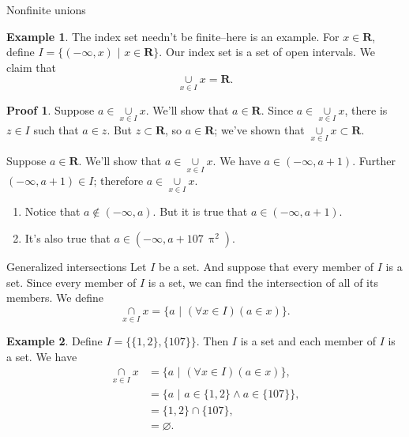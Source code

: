 \documentclass[fleqn]{beamer}
\newcommand{\reals}{\mathbf{R}}
\theoremstyle{definition}
\newtheorem{myex}{Example}
\newtheorem{myproof}{Proof}
\begin{document}
\begin{frame}{Nonfinite unions}

\begin{myex}  The index set needn't be finite--here is an example.  For \(x \in \reals\), define \( I = \{ (-\infty, x) \,\, | \,\, x \in \reals \} \). Our index set is a set of open intervals.
We claim that
\[
    \underset{x \in I}{\cup} x  = \reals.
\]
\end{myex}

\begin{myproof}  Suppose \(a \in   \underset{x \in I}{\cup} x  \).  We'll show that \(a \in \reals\).  Since  \(a \in   \underset{x \in I}{\cup} x  \), there is \(z \in I\) such that \(a \in z\).  But \(z \subset \reals\), so \(a \in \reals\); we've shown that   \( \underset{x \in I}{\cup} x  \subset \reals\).

\quad Suppose \(a \in   \reals\).   We'll show that \(a \in  \underset{x \in I}{\cup} x  \).  We have \(a \in (-\infty, a + 1)\). Further  \( (-\infty, a + 1) \in I\); therefore  \(a \in  \underset{x \in I}{\cup} x \).
\end{myproof}

\begin{enumerate}

\item Notice that \( a \not \in  (-\infty, a)\).  But it is true that \(a \in (-\infty, a + 1)\).

\item It's also true that  \(a \in (-\infty, a + 107 \, \uppi^2)\).
\end{enumerate}
\end{frame}

\begin{frame}{Generalized intersections}
Let \(I\) be a set. And suppose that every member of \(I\) is a set.  Since every member of \(I\) is a set, we can find the intersection of all of its members. We define
\[
    \underset{x \in I}{\cap} x  = \{ a  \, \,  | \, \, (\forall x \in I)(a \in x) \}.
\]


\begin{myex}  Define \(I = \{ \{1,2\}, \{107\} \} \). Then \(I\) is a set and each member of \(I\) is a set. We have
\begin{align*}
 \underset{x \in I}{\cap} x  &= \{ a  \, \,  | \, \, (\forall x \in I)(a \in x) \}, \\
                                                   &= \{ a  \, \,  | \, \,   a \in   \{1,2\}  \land    a \in   \{107\} \}, \\
                                                   &= \{1,2\}  \cap \{107\}, \\
                                                   &=  \varnothing.
\end{align*}

\end{myex}
\end{frame}
\end{document}
